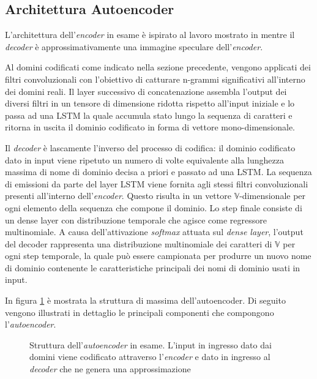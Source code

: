 \subsection{Architettura Autoencoder}
\label{archautoencoder}
L'architettura dell'\textit{encoder} in esame è ispirato al lavoro mostrato in \cite{1508.06615} mentre il \textit{decoder} è approssimativamente una immagine speculare dell'\textit{encoder}.

Al domini codificati come indicato nella sezione precedente, vengono applicati dei filtri convoluzionali con l'obiettivo di catturare n-grammi significativi all'interno dei domini reali. Il layer successivo di concatenazione assembla l'output dei diversi filtri in un tensore di dimensione ridotta rispetto all'input iniziale e lo passa ad una LSTM la quale accumula stato lungo la sequenza di caratteri e ritorna in uscita il dominio codificato in forma di vettore mono-dimensionale.

Il \textit{decoder} è lascamente l'inverso del processo di codifica: il dominio codificato dato in input viene ripetuto un numero di volte equivalente alla lunghezza massima di nome di dominio decisa a priori e passato ad una LSTM. La sequenza di emissioni da parte del layer LSTM viene fornita agli stessi filtri convoluzionali presenti all'interno dell'\textit{encoder}. Questo risulta in un vettore $\mathbb{V}$-dimensionale per ogni elemento della sequenza che compone il dominio.
Lo step finale consiste di un dense layer con distribuzione temporale che agisce come regressore multinomiale. A causa dell'attivazione \textit{softmax} attuata sul \textit{dense layer}, l'output del decoder rappresenta una distribuzione multinomiale dei caratteri di $\mathbb{V}$ per ogni step temporale, la quale può essere campionata per produrre un nuovo nome di dominio contenente le caratteristiche principali dei nomi di dominio usati in input.

In figura \ref{fig:autoencoder1} è mostrata la struttura di massima dell'autoencoder. Di seguito vengono illustrati in dettaglio le principali componenti che compongono l'\textit{autoencoder}. 

\begin{figure}[p]
    \centering
	
	\caption{Struttura dell'\textit{autoencoder} in esame. L'input in ingresso dato dai domini viene codificato attraverso l'\textit{encoder} e dato in ingresso al \textit{decoder} che ne genera una approssimazione}
\label{fig:autoencoder1}
\end{figure}

